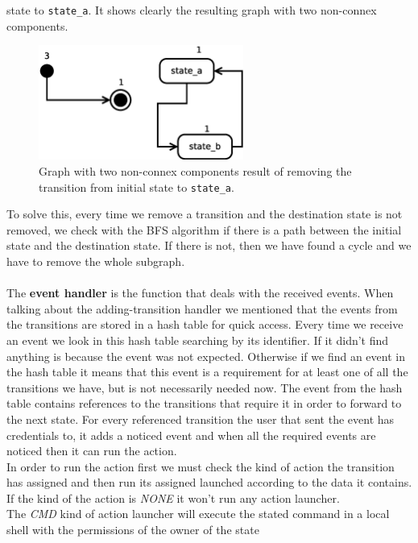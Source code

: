 state to \texttt{state\_a}. It shows clearly the resulting graph with two non-connex components.\\
\begin{figure}[h]
  \centering
  \includegraphics[width=0.6\textwidth,keepaspectratio]{img/bism}
  \caption{Graph with two non-connex components result of removing the transition from initial state to \texttt{state\_a}.}
  \label{fig:bism}
\end{figure}
To solve this, every time we remove a transition and the destination state is not removed, we check with the BFS algorithm if there is a
path between the initial state and the destination state. If there is not, then we have found a cycle and we have to remove the whole 
subgraph.\\
\\
The {\bf event handler} is the function that deals with the received events. When talking about the adding-transition handler we mentioned
that the events from the transitions are stored in a hash table for quick access. Every time we receive an event we look in this hash table
searching by its identifier. If it didn't find anything is because the event was not expected. Otherwise if we find an event in the hash
table it means that this event is a requirement for at least one of all the transitions we have, but is not necessarily needed now.
The event from the hash table contains references to the transitions that require it in order to forward to the next state. For every
referenced transition the user that sent the event has credentials to, it adds a noticed event and when all the required events are 
noticed then it can run the action.\\
In order to run the action first we must check the kind of action the transition has assigned and then run its assigned launched according
to the data it contains.\\
If the kind of the action is \emph{NONE} it won't run any action launcher.\\
The \emph{CMD} kind of action launcher will execute the stated command in a local shell with the permissions of the owner of the state 
